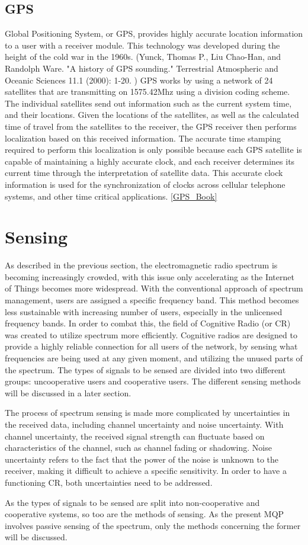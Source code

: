 \subsection{GPS}
Global Positioning System, or GPS, provides highly accurate location information to a user with a receiver module. This technology was developed during the height of the cold war in the 1960s. (Yunck, Thomas P., Liu Chao-Han, and Randolph Ware. "A history of GPS sounding." Terrestrial Atmospheric and Oceanic Sciences 11.1 (2000): 1-20. ) GPS works by using a network of 24 satellites that are transmitting on 1575.42Mhz using a division coding scheme. The individual satellites send out information such as the current system time, and their locations. Given the locations of the satellites, as well as the calculated time of travel from the satellites to the receiver, the GPS receiver then performs localization based on this received information. The accurate time stamping required to perform this localization is only possible because each GPS satellite is capable of maintaining a highly accurate clock, and each receiver determines its current time through the interpretation of satellite data. This accurate clock information is used for the synchronization of clocks across cellular telephone systems, and other time critical applications. \ref{GPS_Book}

\section{Sensing}
As described in the previous section, the electromagnetic radio spectrum is becoming increasingly crowded, with this issue only accelerating as the Internet of Things becomes more widespread. With the conventional approach of spectrum management, users are assigned a specific frequency band. This method becomes less sustainable with increasing number of users, especially in the unlicensed frequency bands. In order to combat this, the field of Cognitive Radio (or CR) was created to utilize spectrum more efficiently. Cognitive radios are designed to provide a highly reliable connection for all users of the network, by sensing what frequencies are being used at any given moment, and utilizing the unused parts of the spectrum. The types of signals to be sensed are divided into two different groups: uncooperative users and cooperative users. The different sensing methods will be discussed in a later section. \par
The process of spectrum sensing is made more complicated by uncertainties in the received data, including channel uncertainty and noise uncertainty. With channel uncertainty, the received signal strength can fluctuate based on characteristics of the channel, such as channel fading or shadowing. Noise uncertainty refers to the fact that the power of the noise is unknown to the receiver, making it difficult to achieve a specific sensitivity. In order to have a functioning CR, both uncertainties need to be addressed. \par
As the types of signals to be sensed are split into non-cooperative and cooperative systems, so too are the methods of sensing. As the present MQP involves passive sensing of the spectrum, only the methods concerning the former will be discussed.


